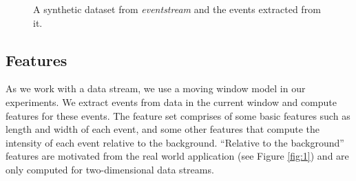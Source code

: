 \documentclass[a4paper,11pt]{article}
\begin{document}
\begin{figure}[H]
	\centering
	\caption{\footnotesize A synthetic dataset from \textit{eventstream} and the events extracted from it.}
	\label{fig:blobs_A_B}
\end{figure}

\subsection{Features}\label{sec:Featurelist}

As we work with a data stream, we use a moving window model in our experiments. We extract events from data in the current window and compute features for these events. The feature set comprises of some basic features such as length and width of each event, and some other features that compute the intensity of each event relative to the background. ``Relative to the background'' features are motivated from the real world application (see Figure \ref{fig:1}) and are only computed for two-dimensional data streams.
\end{document}
